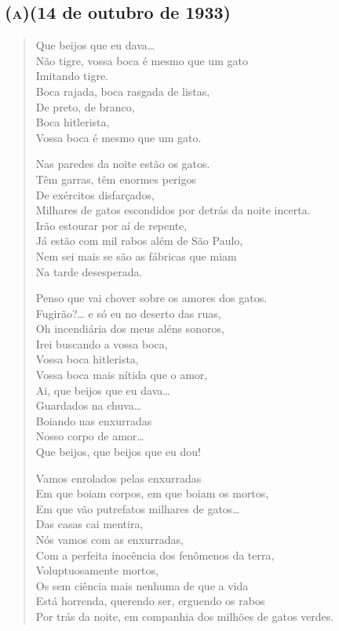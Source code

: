 {\subsection*{\textsc{(a)}\break (14 de outubro de 1933)}

\begin{verse}
Que beijos que eu dava\ldots{}\\
Não tigre, vossa boca é mesmo que um gato\\
Imitando tigre.\\
Boca rajada, boca rasgada de listas,\\
De preto, de branco,\\
Boca hitlerista,\\
Vossa boca é mesmo que um gato.

Nas paredes da noite estão os gatos.\\
Têm garras, têm enormes perigos\\
De exércitos disfarçados,\\
Milhares de gatos escondidos por detrás da noite incerta.\\
Irão estourar por aí de repente,\\
Já estão com mil rabos além de São Paulo,\\
Nem sei mais se são as fábricas que miam\\
Na tarde desesperada.

Penso que vai chover sobre os amores dos gatos.\\
Fugirão?\ldots{} e só eu no deserto das ruas,\\
Oh incendiária dos meus aléns sonoros,\\
Irei buscando a vossa boca,\\
Vossa boca hitlerista,\\
Vossa boca mais nítida que o amor,\\
Ai, que beijos que eu dava\ldots{}\\
Guardados na chuva\ldots{}\\
Boiando nas enxurradas\\
Nosso corpo de amor\ldots{}\\
Que beijos, que beijos que eu dou!

Vamos enrolados pelas enxurradas\\
Em que boiam corpos, em que boiam os mortos,\\
Em que vão putrefatos milhares de gatos\ldots{}\\
Das casas cai mentira,\\
Nós vamos com as enxurradas,\\
Com a perfeita inocência dos fenômenos da terra,\\
Voluptuosamente mortos,\\
Os sem ciência mais nenhuma de que a vida\\
Está horrenda, querendo ser, erguendo os rabos\\
Por trás da noite, em companhia dos milhões de gatos verdes.
\end{verse}

}
